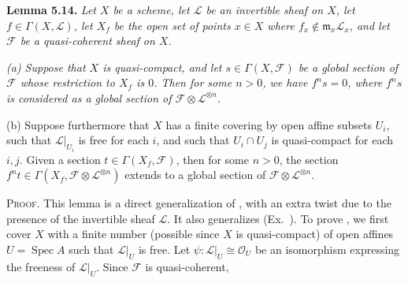 {\medskip
\noindent\hypertarget{result-II-5.14}{}\textbf{Lemma 5.14.} \emph{Let $X$ be a scheme, let $\mathcal L$ be an invertible sheaf on $X$, let $f\in\Gamma(X,\mathcal L)$, let $X_f$ be the open set of points $x\in X$ where $f_x\notin\mathfrak m_x\mathcal L_x$, and let $\mathcal F$ be a quasi-coherent sheaf on $X$.}
\par{\itshape\leftskip=12pt
\hypertarget{result-II-5.14a}{}(a) Suppose that $X$ is quasi-compact, and let $s\in\Gamma(X,\mathcal F)$ be a global section of $\mathcal F$ whose restriction to $X_f$ is $0$. Then for some $n>0$, we have $f^ns=0$, where $f^ns$ is considered as a global section of $\mathcal F\otimes\mathcal L^{\otimes n}$.

\hypertarget{result-II-5.14b}{}(b) Suppose furthermore that $X$ has a finite covering by open affine subsets $U_i$, such that $\mathcal L|_{U_i}$ is free for each $i$, and such that $U_i\cap U_j$ is quasi-compact for each $i,j$. Given a section $t\in\Gamma(X_f,\mathcal F)$, then for some $n>0$, the section $f^nt\in\Gamma(X_f,\mathcal F\otimes\mathcal L^{\otimes n})$ extends to a global section of $\mathcal F\otimes\mathcal L^{\otimes n}$.\par}

\smallskip
\noindent\textsc{Proof.} This lemma is a direct generalization of , with an extra twist due to the presence of the invertible sheaf $\mathcal L$. It also generalizes (Ex.~). To prove , we first cover $X$ with a finite number (possible since $X$ is quasi-compact) of open affines $U=\operatorname{Spec}A$ such that $\mathcal L|_U$ is free. Let $\psi\colon\mathcal L|_U\cong\mathcal O_U$ be an isomorphism expressing the freeness of $\mathcal L|_U$. Since $\mathcal F$ is quasi-coherent,
}
